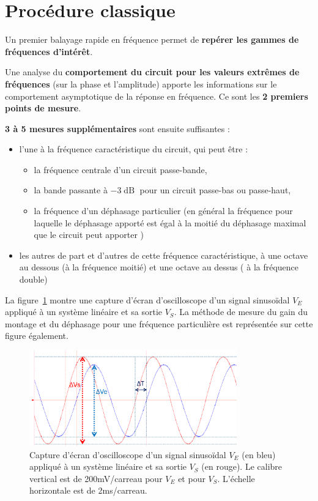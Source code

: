 \section{Procédure classique}

Un premier balayage rapide en fréquence permet de \textbf{repérer les gammes de fréquences d'intérêt}.

Une analyse du \textbf{comportement du circuit pour les valeurs extrêmes de fréquences} (sur la phase et l'amplitude) apporte les informations sur le comportement asymptotique de la réponse en fréquence. Ce sont les \textbf{2 premiers points de mesure}.

\textbf{3 à 5 mesures supplémentaires} sont ensuite suffisantes :
\begin{itemize}
	\item l'une à la fréquence caractéristique du circuit, qui peut être : 
	\begin{itemize}
		\item la fréquence centrale d'un circuit passe-bande, 
		\item la bande passante à $-3\operatorname{dB}$ pour un circuit passe-bas ou passe-haut,
		\item la fréquence d'un déphasage particulier (en général la fréquence pour laquelle le déphasage apporté est égal à la moitié du déphasage maximal que le circuit peut apporter )
	\end{itemize}
	\item les autres de part et d'autres de cette fréquence caractéristique, à une octave au dessous (à la fréquence moitié) et une octave au dessus ( à la fréquence double)
\end{itemize}

\medskip

La figure~\ref{fig:rf_mesure} montre une capture d'écran d'oscilloscope d'un signal sinusoïdal $V_E$ appliqué à un système linéaire et sa sortie $V_S$. La méthode de mesure du gain du montage et du déphasage pour une fréquence particulière est représentée sur cette figure également.

\begin{figure}[h!]
    \centering
	\includegraphics[width=0.8\textwidth]{images/rf_bode.png}
	
    \caption{Capture d'écran d'oscilloscope d'un signal sinusoïdal $V_E$ (en bleu) appliqué à un système linéaire et sa sortie $V_S$ (en rouge). Le calibre vertical est de 200mV/carreau pour $V_E$ et pour $V_S$. L'échelle horizontale est de 2ms/carreau.}
    \label{fig:rf_mesure}
\end{figure}

